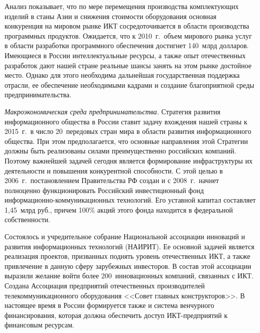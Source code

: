\begin{multicols}{2}
     Анализ показывает, что по мере перемещения производства комплектующих изделий
в станы Азии и снижения стоимости оборудования основная конкуренция на мировом
рынке ИКТ сосредоточивается в области производства про\-грам\-мных продуктов.
Ожидается, что к 2010~г.\ объем мирового рынка услуг в области разработки
про\-грам\-мно\-го обеспечения достигнет 140~млрд долларов. Име\-ющие\-ся в 
России интеллектуальные ресурсы, а также опыт отечественных разработок дают 
нашей стране реальные шансы занять на этом рынке достойное место. Однако для 
этого необходима дальнейшая государственная поддержка отрасли, ее обеспечение 
необходимыми кадрами и создание благоприятной среды предпринимательства.

     \vspace*{1pt}
     \textit{Макроэкономическая среда предпринимательства.} Стратегия развития
информационного общества в России ставит задачу вхождения нашей страны к 2015~г.\ в
число 20~передовых стран мира в области развития информационного общества. При
этом предполагается, что основные направления этой Стратегии должны быть
реализованы силами преимущественно российских компаний. %
Поэтому важнейшей задачей сегодня является формирование инфраструктуры их 
деятельности и повышения конкурентной способности. С этой целью в 2006~г.\ 
постановлением Правительства РФ создан и с 2008~г.\ нач\-нет полноценно 
функционировать Российский инвестиционный фонд 
ин\-фор\-ма\-ци\-он\-но-ком\-му\-ни\-ка\-ци\-он\-ных технологий. Его уставной 
капитал составляет 1,45~млрд руб., причем 100\% акций этого фонда находится в 
федеральной соб\-ст\-вен\-ности. {\looseness=1

}

     Состоялось и учредительное собрание Национальной ассоциации инноваций и
развития информационных технологий (НАИРИТ). Ее основной задачей является
реализация проектов, призванных поднять уровень отечественных ИКТ, а также
привлечение в данную сферу зарубежных инвесторов. В состав этой ассоциации выразили
желание войти более 200~инновационных компаний, связанных с ИКТ. Создана
Ассоциация предприятий отечественных производителей телекоммуникационного
оборудования <<Совет главных конструкторов>>. В настоящее время в России
формируется также и система венчурного финансирования, которая должна обеспечить
доступ ИКТ-предприятий к финансовым ресурсам.


\end{multicols}
